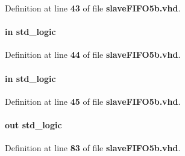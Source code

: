 Definition at line {\bf 43} of file {\bf slave\+F\+I\+F\+O5b.\+vhd}.

\paragraph[{flagc}]{ {\bfseries \textcolor{keywordflow}{in}\textcolor{vhdlchar}{ }} {\bfseries \textcolor{comment}{std\+\_\+logic}\textcolor{vhdlchar}{ }} \hspace{0.3cm}{\ttfamily [Port]}}\label{classslaveFIFO5b_a6c3155d829768c8484cc2c64eeace62d}


Definition at line {\bf 44} of file {\bf slave\+F\+I\+F\+O5b.\+vhd}.

\paragraph[{flagd}]{ {\bfseries \textcolor{keywordflow}{in}\textcolor{vhdlchar}{ }} {\bfseries \textcolor{comment}{std\+\_\+logic}\textcolor{vhdlchar}{ }} \hspace{0.3cm}{\ttfamily [Port]}}\label{classslaveFIFO5b_aaf1c54fa042c423c23880b0e66ce27e8}


Definition at line {\bf 45} of file {\bf slave\+F\+I\+F\+O5b.\+vhd}.

\paragraph[{G\+P\+I\+F\+\_\+busy}]{ {\bfseries \textcolor{keywordflow}{out}\textcolor{vhdlchar}{ }} {\bfseries \textcolor{comment}{std\+\_\+logic}\textcolor{vhdlchar}{ }} \hspace{0.3cm}{\ttfamily [Port]}}\label{classslaveFIFO5b_add28abe0c534d568abd33e467de87a97}


Definition at line {\bf 83} of file {\bf slave\+F\+I\+F\+O5b.\+vhd}.

